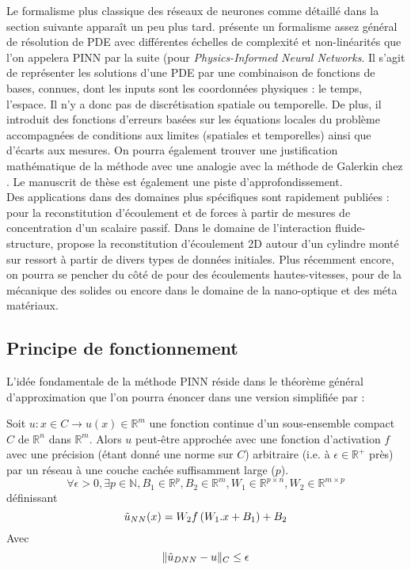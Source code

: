 Le formalisme plus classique des réseaux de neurones comme détaillé dans la section suivante apparaît un peu plus tard. \cite{raissiPhysicsinformedNeuralNetworks2019} présente un formalisme assez général de résolution de PDE avec différentes échelles de complexité et non-linéarités que l'on appelera PINN par la suite (pour \textit{Physics-Informed Neural Networks}. Il s'agit de représenter les solutions d'une PDE par une combinaison de fonctions de bases, connues, dont les inputs sont les coordonnées physiques : le temps, l'espace. Il n'y a donc pas de discrétisation spatiale ou temporelle. De plus, il introduit des fonctions d'erreurs basées sur les équations locales du problème accompagnées de conditions aux limites (spatiales et temporelles) ainsi que d'écarts aux mesures. On pourra également trouver une justification mathématique de la méthode avec une analogie avec la méthode de Galerkin chez \cite{al-aradiSolvingNonlinearHighDimensional}. Le manuscrit de thèse \cite{rudyComputationalMethodsSystem2019} est également une piste d'approfondissement.\\

Des applications dans des domaines plus spécifiques sont rapidement publiées : \cite{raissiHiddenFluidMechanics2018} pour la reconstitution d'écoulement et de forces à partir de mesures de concentration d'un scalaire passif. Dans le domaine de l'interaction fluide-structure, \cite{raissiDeepLearningVortexinduced2019a} propose la reconstitution d'écoulement 2D autour d'un cylindre monté sur ressort à partir de divers types de données initiales. Plus récemment encore, on pourra se pencher du côté de \cite{maoPhysicsinformedNeuralNetworks2020} pour des écoulements hautes-vitesses, \cite{haghighatDeepLearningFramework2020,luExtractionMechanicalProperties2020} pour de la mécanique des solides ou encore \cite{chenPhysicsinformedNeuralNetworks2020} dans le domaine de la nano-optique et des méta matériaux.\


\subsection{Principe de fonctionnement}

L'idée fondamentale de la méthode PINN réside dans le théorème général d'approximation \cite{hornikMultilayerFeedforwardNetworks1989} que l'on pourra énoncer dans une version simplifiée par : 

\begin{theorem}
Soit $u : x\in  C \rightarrow u(x) \in \mathbb{R}^m$ une fonction continue d'un sous-ensemble compact $C$ de $\mathbb{R}^n$ dans $\mathbb{R}^m$. Alors $u$ peut-être approchée avec une fonction d'activation $f$ avec une précision (étant donné une norme sur $C$) arbitraire (i.e. à $\epsilon \in \mathbb{R}^+$ près) par un réseau à une couche cachée suffisamment large ($p$).
$$ \forall \epsilon > 0, \exists p\in \mathbb{N}, B_1 \in \mathbb{R}^p, B_2 \in \mathbb{R}^m, W_1 \in \mathbb{R}^{p\times n}, W_2 \in \mathbb{R}^{m \times p} $$
définissant
$$ \Tilde{u}_{NN} (x) = W_2 f\left( W_1 . x + B_1  \right) + B_2 $$
Avec 
$$ \| \Tilde{u}_{DNN} - u \|_{C} \leq \epsilon $$
\end{theorem}

